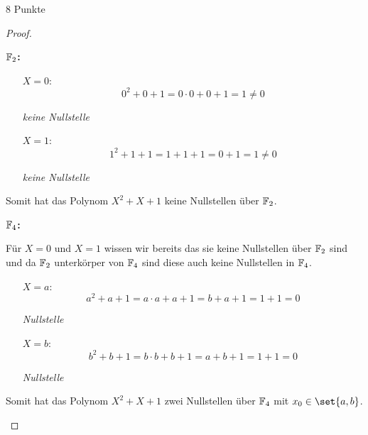 \documentclass{problemset}
\begin{document}
\begin{problem}{8 Punkte}
\begin{proof}
\begin{enumerate}
              \textbf{$\mathbb{F}_2$:}
              \begin{itemize}
                  \item [$X = 0$:]
                        \[
                            0^2 + 0 + 1 = 0 \cdot 0 + 0 + 1 = 1 \neq 0
                        \]

                        \textit{keine Nullstelle}

                  \item [$X = 1$:]
                        \[
                            1^2 + 1 + 1 = 1 + 1 + 1 = 0 + 1 = 1 \neq 0
                        \]

                        \textit{keine Nullstelle}

              \end{itemize}

              Somit hat das Polynom $X^2 + X + 1$ keine Nullstellen über $\mathbb{F}_2$.

              \textbf{$\mathbb{F}_4$:}

              Für $X = 0$ und $X = 1$ wissen wir bereits das sie keine Nullstellen über
              $\mathbb{F}_2$ sind und da $\mathbb{F}_2$ unterkörper von $\mathbb{F}_4$ sind
              diese auch keine Nullstellen in $\mathbb{F}_4$.
              \begin{itemize}
                  \item [$X = a$:]
                        \[
                            a^2 + a + 1 = a \cdot a + a + 1 = b + a + 1 = 1 + 1 = 0
                        \]

                        \textit{Nullstelle} \checkmark

                  \item [$X = b$:]
                        \[
                            b^2 + b + 1 = b \cdot b + b + 1 = a + b + 1 = 1 + 1 = 0
                        \]

                        \textit{Nullstelle} \checkmark

              \end{itemize}

              Somit hat das Polynom $X^2 + X + 1$ zwei Nullstellen über $\mathbb{F}_4$ mit
              $x_0 \in \set{a,b}$.
    \end{enumerate}
\end{proof}
\end{problem}
\end{document}
